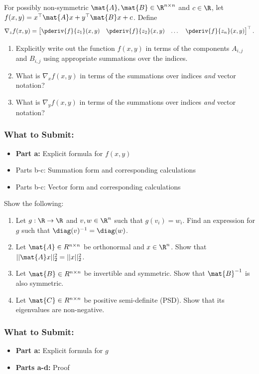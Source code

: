 \documentclass{article}
\begin{document}
\begin{aprob} \label{prob:sumvec}
    For possibly non-symmetric $\mat{A}, \mat{B} \in \R^{n \times n}$ and $c \in \R$, let $f(x, y) = x^\top \mat{A} x + y^\top \mat{B} x + c$. Define
    $$\nabla_z f(x,y) = \begin{bmatrix}
        \pderiv{f}{z_1}(x,y) & \pderiv{f}{z_2}(x,y) & \dots & \pderiv{f}{z_n}(x,y)
    \end{bmatrix}^\top.$$  
    \begin{enumerate}
    	\item {} Explicitly write out the function $f(x, y)$ in terms of the components $A_{i,j}$ and $B_{i,j}$ using appropriate summations over the indices.
    	\item {} What is $\nabla_x f(x,y)$ in terms of the summations over indices \emph{and} vector notation?
    	\item {} What is $\nabla_y f(x,y)$ in terms of the summations over indices \emph{and} vector notation?
    \end{enumerate}
    \subsubsection*{What to Submit:}
    \begin{itemize}
        \item \textbf{Part a:} Explicit formula for $f(x, y)$
        \item{Parts b-c:} Summation form and corresponding calculations
        \item{Parts b-c:} Vector form and corresponding calculations
    \end{itemize}
\end{aprob}

\begin{aprob}\label{prob:matrixtype}
    Show the following:
    \begin{enumerate}
        \item {} Let $g : \R \rightarrow \R$ and $v, w \in \R^n$ such that $g(v_i) = w_i$. Find an expression for $g$ such that $\diag(v)^{-1} = \diag(w)$.
        \item {} Let $\mat{A} \in R^{n \times n}$ be orthonormal and $x \in \R^n$. Show that $||\mat{A}x||_2^2 = ||x||_2^2$.
        \item {} Let $\mat{B} \in R^{n \times n}$ be invertible and symmetric. Show that $\mat{B}^{-1}$ is also symmetric.
        \item {} Let $\mat{C} \in R^{n \times n}$ be positive semi-definite (PSD). Show that its eigenvalues are non-negative.
    \end{enumerate}
    \subsubsection*{What to Submit:}
    \begin{itemize}
        \item \textbf{Part a:} Explicit formula for $g$
        \item \textbf{Parts a-d:} Proof
    \end{itemize}
\end{aprob}
\end{document}
